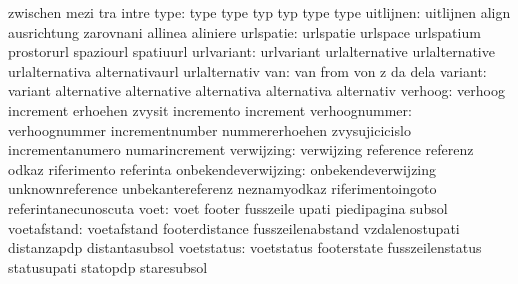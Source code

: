                            zwischen                  mezi
                           tra                       intre
                     type: type                      type
                           typ                       typ
                           type                      type %
                uitlijnen: uitlijnen                 align
                           ausrichtung               zarovnani
                           allinea                   aliniere
                urlspatie: urlspatie                 urlspace
                           urlspatium                prostorurl
                           spaziourl                 spatiuurl
               urlvariant: urlvariant                urlalternative
                           urlalternative            urlalternativa
                           alternativaurl            urlalternativ
                      van: van                       from
                           von                       z
                           da                        dela
                  variant: variant                   alternative
                           alternative               alternativa
                           alternativa               alternativ
                  verhoog: verhoog                   increment
                           erhoehen                  zvysit
                           incremento                increment %
            verhoognummer: verhoognummer             incrementnumber
                           nummererhoehen            zvysujicicislo
                           incrementanumero          numarincrement
               verwijzing: verwijzing                reference
                           referenz                  odkaz
                           riferimento               referinta
      onbekendeverwijzing: onbekendeverwijzing       unknownreference
                           unbekantereferenz         neznamyodkaz
                           riferimentoingoto         referintanecunoscuta
                     voet: voet                      footer
                           fusszeile                 upati
                           piedipagina               subsol
              voetafstand: voetafstand               footerdistance
                           fusszeilenabstand         vzdalenostupati
                           distanzapdp               distantasubsol
               voetstatus: voetstatus                footerstate
                           fusszeilenstatus          statusupati
                           statopdp                  staresubsol
